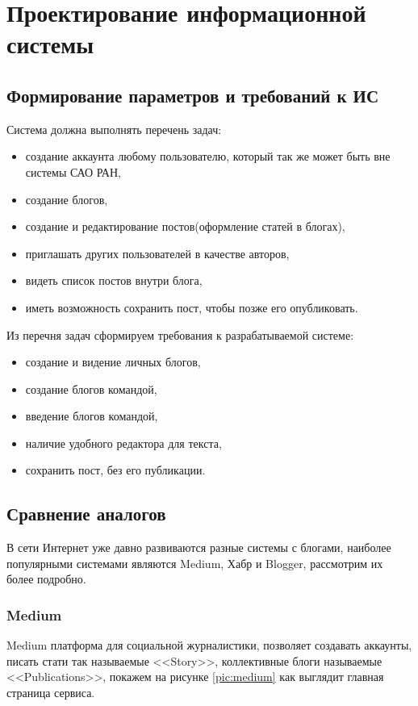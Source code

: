 \section{Проектирование информационной системы}

\subsection{Формирование параметров и требований к ИС}
Система должна выполнять перечень задач:
\begin{itemize}
	\item создание аккаунта любому пользователю, который так же может быть вне системы САО РАН, 
	\item создание блогов,
	\item создание и редактирование постов(оформление статей в блогах),
	\item приглашать других пользователей в качестве авторов,
	\item видеть список постов внутри блога,
	\item иметь возможность сохранить пост, чтобы позже его опубликовать. 
\end{itemize}

Из перечня задач сформируем требования к разрабатываемой системе:
\begin{itemize}
	\item создание и видение личных блогов,
	\item создание блогов командой,
	\item введение блогов командой,
	\item наличие удобного редактора для текста,
	\item сохранить пост, без его публикации. 
\end{itemize}

\subsection{Сравнение аналогов}
В сети Интернет уже давно развиваются разные системы с блогами, наиболее популярными системами являются Medium, Хабр и Blogger, рассмотрим их более подробно.

\pagebreak
\subsubsection{Medium}
Medium платформа для социальной журналистики, позволяет создавать аккаунты, писать стати так называемые <<Story>>, коллективные блоги называемые <<Publications>>, покажем на рисунке \ref{pic:medium} как выглядит главная страница сервиса.





 



\pagebreak